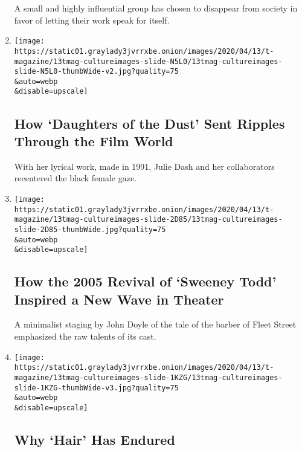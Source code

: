\begin{enumerate}
  A small and highly influential group has chosen to disappear from
  society in favor of letting their work speak for itself.
\item
  \href{/interactive/2020/04/13/t-magazine/daughters-of-the-dust.html}{}

  \texttt{[image: https://static01.graylady3jvrrxbe.onion/images/2020/04/13/t-magazine/13tmag-cultureimages-slide-N5L0/13tmag-cultureimages-slide-N5L0-thumbWide-v2.jpg?quality=75\\\&auto=webp\\\&disable=upscale]}

  \hypertarget{how-daughters-of-the-dust-sent-ripples-through-the-film-world}{%
  \subsection{How `Daughters of the Dust' Sent Ripples Through the Film
  World}\label{how-daughters-of-the-dust-sent-ripples-through-the-film-world}}

  With her lyrical work, made in 1991, Julie Dash and her collaborators
  recentered the black female gaze.
\item
  \href{/interactive/2020/04/13/t-magazine/sweeney-todd-revival.html}{}

  \texttt{[image: https://static01.graylady3jvrrxbe.onion/images/2020/04/13/t-magazine/13tmag-cultureimages-slide-2D85/13tmag-cultureimages-slide-2D85-thumbWide.jpg?quality=75\\\&auto=webp\\\&disable=upscale]}

  \hypertarget{how-the-2005-revival-of-sweeney-todd-inspired-a-new-wave-in-theater}{%
  \subsection{How the 2005 Revival of `Sweeney Todd' Inspired a New Wave
  in
  Theater}\label{how-the-2005-revival-of-sweeney-todd-inspired-a-new-wave-in-theater}}

  A minimalist staging by John Doyle of the tale of the barber of Fleet
  Street emphasized the raw talents of its cast.
\item
  \href{/interactive/2020/04/13/t-magazine/hair-musical-broadway.html}{}

  \texttt{[image: https://static01.graylady3jvrrxbe.onion/images/2020/04/13/t-magazine/13tmag-cultureimages-slide-1KZG/13tmag-cultureimages-slide-1KZG-thumbWide-v3.jpg?quality=75\\\&auto=webp\\\&disable=upscale]}

  \hypertarget{why-hair-has-endured}{%
  \subsection{Why `Hair' Has Endured}\label{why-hair-has-endured}}


\end{enumerate}
